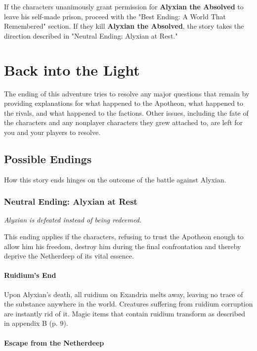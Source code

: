 \documentclass[a4paper, 11pt, bg=full, twocolumn, nooutline]{dndbook}
\begin{document}
If the characters unanimously grant permission for \textbf{Alyxian the Absolved} to leave his self-made prison, proceed with the "Best Ending: A World That Remembered" section. If they kill \textbf{Alyxian the Absolved}, the story takes the direction described in "Neutral Ending: Alyxian at Rest."

\section{Back into the Light}

The ending of this adventure tries to resolve any major questions that remain by providing explanations for what happened to the Apotheon, what happened to the rivals, and what happened to the factions. Other issues, including the fate of the characters and any nonplayer characters they grew attached to, are left for you and your players to resolve.

\subsection{Possible Endings}

How this story ends hinges on the outcome of the battle against Alyxian.

\subsubsection{Neutral Ending: Alyxian at Rest}

\textit{Alyxian is defeated instead of being redeemed.}

This ending applies if the characters, refusing to trust the Apotheon enough to allow him his freedom, destroy him during the final confrontation and thereby deprive the Netherdeep of its vital essence.

\paragraph{Ruidium's End}

Upon Alyxian's death, all ruidium on Exandria melts away, leaving no trace of the substance anywhere in the world. Creatures suffering from ruidium corruption are instantly rid of it. Magic items that contain ruidium transform as described in appendix B (p. 9).

\paragraph{Escape from the Netherdeep}
\end{document}

